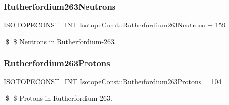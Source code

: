 \subsubsection{\texorpdfstring{Rutherfordium263\+Neutrons}{Rutherfordium263Neutrons}}
{\footnotesize\ttfamily \mbox{\hyperlink{group___isotope_const-_macros_ga5f18360b3e99483a35c32d789e62621c}{I\+S\+O\+T\+O\+P\+E\+C\+O\+N\+S\+T\+\_\+\+I\+NT}} Isotope\+Const\+::\+Rutherfordium263\+Neutrons = 159}

\$ \$ Neutrons in Rutherfordium-\/263. \mbox{\label{group___isotope_const-_rutherfordium-_rf263_gaeb50ead4712e514768cff008aa7c628b}} 
\subsubsection{\texorpdfstring{Rutherfordium263\+Protons}{Rutherfordium263Protons}}
{\footnotesize\ttfamily \mbox{\hyperlink{group___isotope_const-_macros_ga5f18360b3e99483a35c32d789e62621c}{I\+S\+O\+T\+O\+P\+E\+C\+O\+N\+S\+T\+\_\+\+I\+NT}} Isotope\+Const\+::\+Rutherfordium263\+Protons = 104}

\$ \$ Protons in Rutherfordium-\/263. 